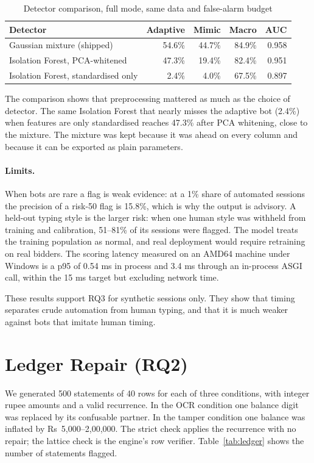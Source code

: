 \begin{table}[htbp]
\centering
\caption{Detector comparison, full mode, same data and false-alarm budget}
\label{tab:cmp}
\small
\begin{tabular}{@{}lrrrr@{}}
\toprule
\textbf{Detector} & \textbf{Adaptive} & \textbf{Mimic} & \textbf{Macro} & \textbf{AUC} \\
\midrule
Gaussian mixture (shipped) & 54.6\% & 44.7\% & 84.9\% & 0.958 \\
Isolation Forest, PCA-whitened & 47.3\% & 19.4\% & 82.4\% & 0.951 \\
Isolation Forest, standardised only & 2.4\% & 4.0\% & 67.5\% & 0.897 \\
\bottomrule
\end{tabular}
\end{table}

The comparison shows that preprocessing mattered as much as the choice of detector. The same Isolation Forest that nearly misses the adaptive bot (2.4\%) when features are only standardised reaches 47.3\% after PCA whitening, close to the mixture. The mixture was kept because it was ahead on every column and because it can be exported as plain parameters.

\paragraph{Limits.} When bots are rare a flag is weak evidence: at a 1\% share of automated sessions the precision of a risk-50 flag is 15.8\%, which is why the output is advisory. A held-out typing style is the larger risk: when one human style was withheld from training and calibration, 51--81\% of its sessions were flagged. The model treats the training population as normal, and real deployment would require retraining on real bidders. The scoring latency measured on an AMD64 machine under Windows is a p95 of 0.54 ms in process and 3.4 ms through an in-process ASGI call, within the 15 ms target but excluding network time.

These results support RQ3 for synthetic sessions only. They show that timing separates crude automation from human typing, and that it is much weaker against bots that imitate human timing.

\section{Ledger Repair (RQ2)}
\label{sec:res_ledger}
We generated 500 statements of 40 rows for each of three conditions, with integer rupee amounts and a valid recurrence. In the OCR condition one balance digit was replaced by its confusable partner. In the tamper condition one balance was inflated by Rs~5{,}000--2{,}00{,}000. The strict check applies the recurrence with no repair; the lattice check is the engine's row verifier. Table~\ref{tab:ledger} shows the number of statements flagged.

